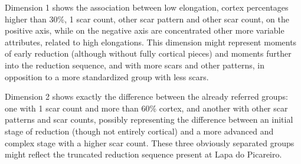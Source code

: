 \documentclass[12pt,twoside]{reedthesis}
\begin{document}
Dimension 1 shows the association between low elongation, cortex percentages higher than 30\%, 1 scar count, other scar pattern and other scar count, on the positive axis, while on the negative axis are concentrated other more variable attributes, related to high elongations. This dimension might represent moments of early reduction (although without fully cortical pieces) and moments further into the reduction sequence, and with more scars and other patterns, in opposition to a more standardized group with less scars.

Dimension 2 shows exactly the difference between the already referred groups: one with 1 scar count and more than 60\% cortex, and another with other scar patterns and scar counts, possibly representing the difference between an initial stage of reduction (though not entirely cortical) and a more advanced and complex stage with a higher scar count. These three obviously separated groups might reflect the truncated reduction sequence present at Lapa do Picareiro.
\end{document}

